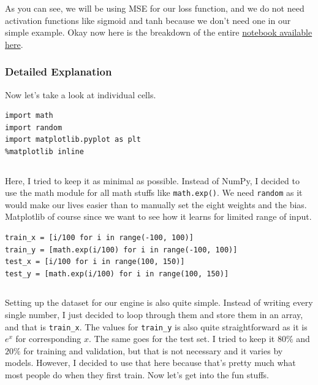 \documentclass[../../../main.tex]{subfiles}
\begin{document}
As you can see, we will be using MSE for our loss function, and we
do not need activation functions like sigmoid and tanh because we
don't need one in our simple example. Okay now here is the breakdown
of the entire \href{https://github.com/enochness/LibreNotebook/blob/main/assets/src/CS01/26dmyng-1.ipynb}{notebook available here}.

\subsubsection{Detailed Explanation}

Now let's take a look at individual cells.

\begin{jupyter}
\begin{lstlisting}[style=jin]
import math
import random
import matplotlib.pyplot as plt
%matplotlib inline
\end{lstlisting}
\begin{lstlisting}[style=jout]
\end{lstlisting}
\end{jupyter}

Here, I tried to keep it as minimal as possible. Instead of
NumPy, I decided to use the math module for all math stuffs like
\verb|math.exp()|. We need \verb|random| as it would make our lives
easier than to manually set the eight weights and the bias.
Matplotlib of course since we want to see how it learns for limited
range of input.

\begin{jupyter}
\begin{lstlisting}[style=jin]
train_x = [i/100 for i in range(-100, 100)]
train_y = [math.exp(i/100) for i in range(-100, 100)]
test_x = [i/100 for i in range(100, 150)]
test_y = [math.exp(i/100) for i in range(100, 150)]
\end{lstlisting}
\begin{lstlisting}[style=jout]
\end{lstlisting}
\end{jupyter}

Setting up the dataset for our engine is also quite simple.
Instead of writing every single number, I just decided to loop
through them and store them in an array, and that is \verb|train_x|.
The values for \verb|train_y| is also quite straightforward as it
is $e^x$ for corresponding $x$. The same goes for the test set.
I tried to keep it $80\%$ and $20\%$ for training and validation,
but that is not necessary and it varies by models. However, I
decided to use that here because that's pretty much what most
people do when they first train. Now let's get into the fun
stuffs.
\end{document}
